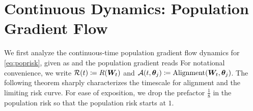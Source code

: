 

\section{Continuous Dynamics: Population Gradient Flow}
\label{sec:continuous}

We first analyze the continuous-time population gradient flow dynamics for \eqref{eq:poprisk}, given as
and the population gradient reads
For notational convenience, we write $\mathcal{R}(t) \coloneqq R(\boldsymbol{W}_t)$ and $\mathcal{A}(t, \boldsymbol{\theta}_j) \coloneqq \mathrm{Alignment}(\boldsymbol{W}_t, \boldsymbol{\theta}_j)$. 
The following theorem sharply characterizes the timescale for alignment and the limiting risk curve. 
For ease of exposition, we drop the prefactor $\frac{1}{8}$ in the population risk so that the population risk starts at $1$.

